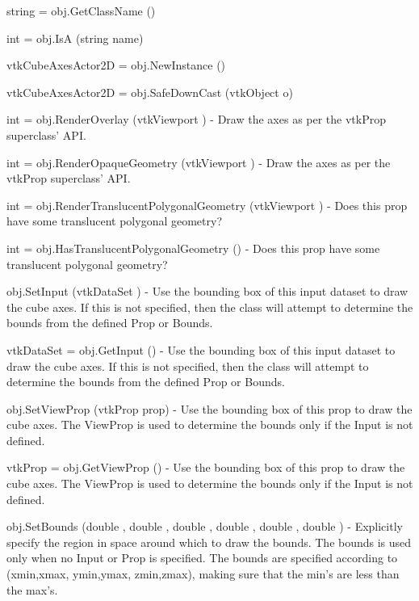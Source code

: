 \begin{DoxyItemize}
\item {\ttfamily string = obj.\-Get\-Class\-Name ()}  
\item {\ttfamily int = obj.\-Is\-A (string name)}  
\item {\ttfamily vtk\-Cube\-Axes\-Actor2\-D = obj.\-New\-Instance ()}  
\item {\ttfamily vtk\-Cube\-Axes\-Actor2\-D = obj.\-Safe\-Down\-Cast (vtk\-Object o)}  
\item {\ttfamily int = obj.\-Render\-Overlay (vtk\-Viewport )} -\/ Draw the axes as per the vtk\-Prop superclass' A\-P\-I.  
\item {\ttfamily int = obj.\-Render\-Opaque\-Geometry (vtk\-Viewport )} -\/ Draw the axes as per the vtk\-Prop superclass' A\-P\-I.  
\item {\ttfamily int = obj.\-Render\-Translucent\-Polygonal\-Geometry (vtk\-Viewport )} -\/ Does this prop have some translucent polygonal geometry?  
\item {\ttfamily int = obj.\-Has\-Translucent\-Polygonal\-Geometry ()} -\/ Does this prop have some translucent polygonal geometry?  
\item {\ttfamily obj.\-Set\-Input (vtk\-Data\-Set )} -\/ Use the bounding box of this input dataset to draw the cube axes. If this is not specified, then the class will attempt to determine the bounds from the defined Prop or Bounds.  
\item {\ttfamily vtk\-Data\-Set = obj.\-Get\-Input ()} -\/ Use the bounding box of this input dataset to draw the cube axes. If this is not specified, then the class will attempt to determine the bounds from the defined Prop or Bounds.  
\item {\ttfamily obj.\-Set\-View\-Prop (vtk\-Prop prop)} -\/ Use the bounding box of this prop to draw the cube axes. The View\-Prop is used to determine the bounds only if the Input is not defined.  
\item {\ttfamily vtk\-Prop = obj.\-Get\-View\-Prop ()} -\/ Use the bounding box of this prop to draw the cube axes. The View\-Prop is used to determine the bounds only if the Input is not defined.  
\item {\ttfamily obj.\-Set\-Bounds (double , double , double , double , double , double )} -\/ Explicitly specify the region in space around which to draw the bounds. The bounds is used only when no Input or Prop is specified. The bounds are specified according to (xmin,xmax, ymin,ymax, zmin,zmax), making sure that the min's are less than the max's.  

\end{DoxyItemize}
